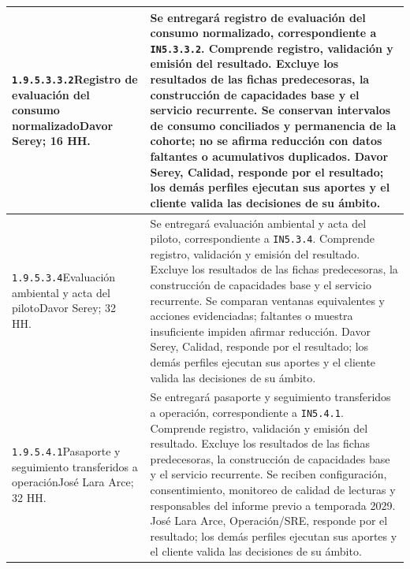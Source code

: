\begin{longtable}{L{52mm}L{91mm}}
\texttt{1.\allowbreak{}9.\allowbreak{}5.\allowbreak{}3.\allowbreak{}3.\allowbreak{}2}\newline Registro de evaluación del consumo normalizado\newline Davor Serey; 16 HH. & Se entregará registro de evaluación del consumo normalizado, correspondiente a \texttt{IN5.3.3.2}. Comprende registro, validación y emisión del resultado. Excluye los resultados de las fichas predecesoras, la construcción de capacidades base y el servicio recurrente.  Se conservan intervalos de consumo conciliados y permanencia de la cohorte; no se afirma reducción con datos faltantes o acumulativos duplicados. Davor Serey, Calidad, responde por el resultado; los demás perfiles ejecutan sus aportes y el cliente valida las decisiones de su ámbito.\\\hline
\texttt{1.\allowbreak{}9.\allowbreak{}5.\allowbreak{}3.\allowbreak{}4}\newline Evaluación ambiental y acta del piloto\newline Davor Serey; 32 HH. & Se entregará evaluación ambiental y acta del piloto, correspondiente a \texttt{IN5.3.4}. Comprende registro, validación y emisión del resultado. Excluye los resultados de las fichas predecesoras, la construcción de capacidades base y el servicio recurrente.  Se comparan ventanas equivalentes y acciones evidenciadas; faltantes o muestra insuficiente impiden afirmar reducción. Davor Serey, Calidad, responde por el resultado; los demás perfiles ejecutan sus aportes y el cliente valida las decisiones de su ámbito.\\\hline
\texttt{1.\allowbreak{}9.\allowbreak{}5.\allowbreak{}4.\allowbreak{}1}\newline Pasaporte y seguimiento transferidos a operación\newline José Lara Arce; 32 HH. & Se entregará pasaporte y seguimiento transferidos a operación, correspondiente a \texttt{IN5.4.1}. Comprende registro, validación y emisión del resultado. Excluye los resultados de las fichas predecesoras, la construcción de capacidades base y el servicio recurrente.  Se reciben configuración, consentimiento, monitoreo de calidad de lecturas y responsables del informe previo a temporada 2029. José Lara Arce, Operación/SRE, responde por el resultado; los demás perfiles ejecutan sus aportes y el cliente valida las decisiones de su ámbito.\\\hline
\end{longtable}
\endgroup
{}
